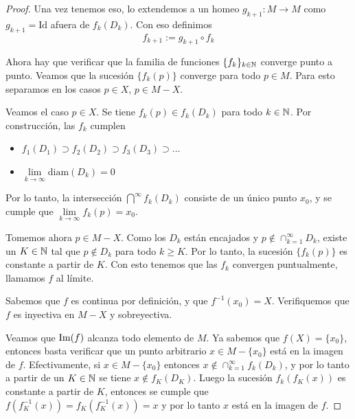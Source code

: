\begin{proof}
    
    Una vez tenemos eso, lo extendemos a un homeo $g_{k+1}:M\to M$ como $g_{k+1} = \text{Id}$ afuera de $f_k(D_k)$. Con eso definimos $$f_{k+1}:= g_{k+1}\circ f_k$$
    


    Ahora hay que verificar que la familia de funciones $\{f_k\}_{k\in\mathbb{N}}$ converge punto a punto. Veamos que la sucesión $\{f_k(p)\}$ converge para todo $p\in M$. Para esto separamos en los casos $p\in X$, $p\in M-X$.

    Veamos el caso $p\in X$. Se tiene $f_k(p)\in f_k(D_k)$ para todo $k\in\mathbb{N}$. Por construcción, las $f_k$ cumplen 
    
    \begin{itemize}
    \item $f_1(D_1)\supset f_2(D_2)\supset f_3(D_3)\supset\dots$
    \item $\lim\limits_{k\to\infty}\text{diam}(D_k)=0$
    \end{itemize}
    Por lo tanto, la intersección $\bigcap\limits^\infty f_k(D_k)$ consiste de un único punto $x_0$, y se cumple que $\lim\limits_{k\to\infty}f_k(p)=x_0$.

    Tomemos ahora $p\in M-X$. Como los $D_k$ están encajados y $p\not\in\cap_{k=1}^\infty D_k$, existe un $K\in\mathbb{N}$ tal que $p\not\in D_k$ para todo $k\geq K$. Por lo tanto, la sucesión $\{f_k(p)\}$ es constante a partir de $K$. Con esto tenemos que las $f_k$ convergen puntualmente, llamamos $f$ al límite.

    Sabemos que $f$ es continua por definición, y que $f^{-1}(x_0)=X$. Verifiquemos que $f$ es inyectiva en $M-X$ y sobreyectiva.

    Veamos que $\text{Im}(f)$ alcanza todo elemento de $M$. Ya sabemos que $f(X)=\{x_0\}$, entonces basta verificar que un punto arbitrario $x\in M-\{x_0\}$ está en la imagen de $f$. Efectivamente, si $x\in M-\{x_0\}$ entonces $x\not\in \cap^\infty_{k=1} f_k(D_k)$, y por lo tanto a partir de un $K\in\mathbb{N}$ se tiene $x\not\in f_K(D_K)$. Luego la sucesión $f_k\left(f_K(x)\right)$ es constante a partir de $K$, entonces se cumple que $f(f^{-1}_K(x))=f_K(f^{-1}_K(x))=x$ y por lo tanto $x$ está en la imagen de $f$.


\end{proof}
